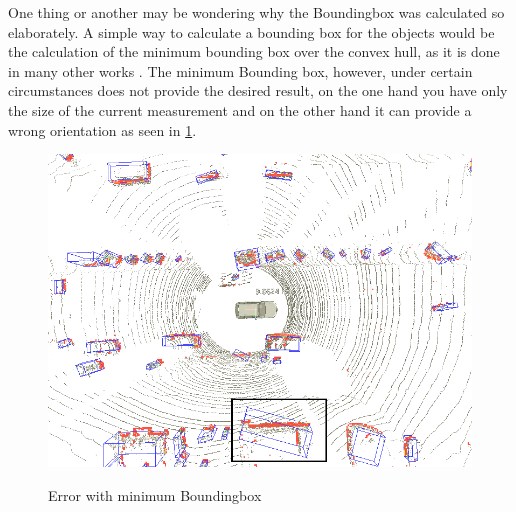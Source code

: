 \documentclass[11pt,oneside,openright]{mpreport}
\begin{document}

One thing or another may be wondering why the Boundingbox was calculated so elaborately. A simple way to calculate a bounding box for the
objects would be the calculation of the minimum bounding box over the convex hull, as it is done in many other works \cite{Zhang, Himmelsbach2009}.
The minimum Bounding box, however, under certain circumstances does not provide the desired result, on the one hand you have only the size of the current measurement and on the 
other hand it can provide a wrong orientation as seen in \cref{min_box}.

\begin{figure}[!ht]
\caption{Error with minimum Boundingbox \cite{Himmelsbach2009}}
\includegraphics[width=\textwidth]{bilder/min_bound.png}
\label{min_box}
\end{figure}

\end{document}
